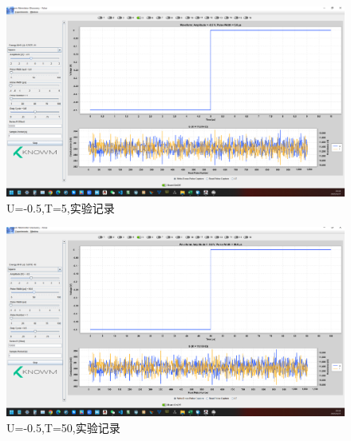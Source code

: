 \documentclass[12pt,hyperref,a4paper,UTF8]{ctexart}
\begin{document}
\begin{figure}[H]
    \centering
    \begin{minipage}{1\textwidth}
        \centering
        \includegraphics[width=1\textwidth]{figures/U-05T5.png}
        \caption{U=-0.5,T=5,实验记录}
        \label{fig:U-05T5}
    \end{minipage}
\end{figure}

\begin{figure}[H]
    \centering
    \begin{minipage}{1\textwidth}
        \centering
        \includegraphics[width=1\textwidth]{figures/U-05T50.png}
        \caption{U=-0.5,T=50,实验记录}
        \label{fig:U-05T50}
    \end{minipage}
\end{figure}
\end{document}
